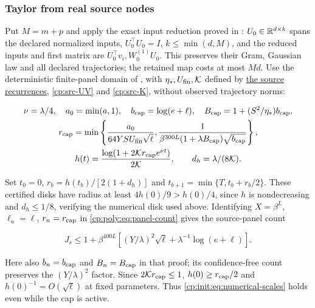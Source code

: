 \subsubsection{Taylor from real source nodes}
\label{cp:init:sec:taylor}

Put $M=m+p$ and apply the exact input reduction proved in :
$U_0\in\mathbb R^{d\times k}$ spans the declared normalized inputs,
$U_0^\top U_0=I$, $k\le\min(d,M)$, and the reduced inputs and
first matrix are $U_0^\top v_i,W_0^{(1)}U_0$. This preserves
their Gram, Gaussian law and all declared trajectories; the retained
map costs at most $Md$.
Use the deterministic finite-panel domain of , with
$\eta_*,U_{\rm fin},\mathcal K$ defined by
\hyperref[cp:src-coefficients]{the source recurrences}, \eqref{cp:src-UV}
and \eqref{cp:src-K}, without observed trajectory norms:

\begin{equation}
\label{cp:init:eq:capped-panels}
\begin{gathered}
\nu=\lambda/4,\quad a_0=\min(a,1),\quad
b_{\rm cap}=\log(e+\ell),\quad B_{\rm cap}=1+(S^2/\eta_*)b_{\rm cap},\\
r_{\rm cap}=\min\left\{\frac{a_0}{64YSU_{\rm fin}\sqrt\ell},
 \frac1{\beta^{300L}(1+\lambda B_{\rm cap})\sqrt{b_{\rm cap}}}\right\},\\
h(t)=\frac{\log(1+2\mathcal K r_{\rm cap}e^{\nu t})}{2\mathcal K},
\qquad d_h=\lambda/(8\mathcal K).
\end{gathered}
\end{equation}

Set $t_0=0$, $r_b=h(t_b)/[2(1+d_h)]$ and
$t_{b+1}=\min\{T,t_b+r_b/2\}$. These certified disks have radius
at least $4h(0)/9>h(0)/4$, since $h$ is nondecreasing and
$d_h\le1/8$, verifying the numerical disk used above. Identifying
$X=\beta^L$, $\ell_n=\ell$, $r_n=r_{\rm cap}$ in
\eqref{cp:poly:eq:panel-count} gives the source-panel count

\begin{equation}
\label{cp:init:eq:taylor-panels}
J_s\le1+\beta^{400L}\left[(Y/\lambda)^2\sqrt\ell
                  +\lambda^{-1}\log(e+\ell)\right].
\end{equation}

Here also $b_n=b_{\rm cap}$ and $B_n=B_{\rm cap}$ in that proof;
its confidence-free count preserves the $(Y/\lambda)^2$ factor.
Since $2\mathcal K r_{\rm cap}\le1$, $h(0)\ge r_{\rm cap}/2$
and $h(0)^{-1}=O(\sqrt\ell)$ at fixed parameters. Thus
\eqref{cp:init:eq:numerical-scales} holds even while the cap is active.

